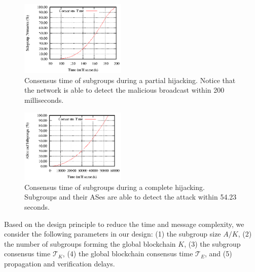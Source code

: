 \documentclass[conference]{IEEEtran}
\begin{document}
\begin{figure}[t]
\begin{center}
\includegraphics[width=0.45\textwidth]{fig/partialHijackR2.eps}
\caption{Consensus time of subgroups during a partial hijacking. Notice that the network is able to detect the malicious broadcast within 200 milliseconds. } 
\label{fig:simPartial}
\end{center}
\end{figure}

\begin{figure}[t]
\begin{center}
\includegraphics[width=0.45\textwidth]{fig/completeHijackR2.eps}
\caption{Consensus time of subgroups during a complete hijacking. Subgroups and their ASes are able to detect the attack within 54.23 seconds.} 
\label{fig:simComplete}
\end{center}
\end{figure}





Based on the design principle to reduce the time and message complexity, we consider the following parameters in our design: (1) the subgroup size $A/K$, (2) the number of subgroups forming the global blockchain $K$, (3) the subgroup consensus time $\mathcal{T}_{K}$, (4) the global blockchain consensus time $\mathcal{T}_{E}$, and (5) propagation and verification delays. 
\end{document}
